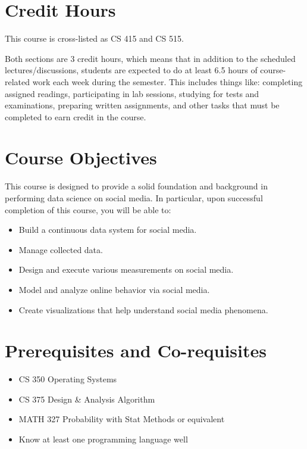 \documentclass[11pt,article,oneside]{memoir} %
\begin{document}
\section{Credit Hours}

This course is cross-listed as CS 415 and CS 515.

Both sections are 3 credit hours, which means that in addition to the scheduled lectures/discussions, students are expected to do at least 6.5 hours of course-related work each week during the semester.
This includes things like: completing assigned readings, participating in lab sessions, studying for tests and examinations, preparing written assignments, and other tasks that must be completed to earn credit in the course.

\section{Course Objectives}%

This course is designed to provide a solid foundation and background in performing data science on social media.
In particular, upon successful completion of this course, you will be able to:

\begin{itemize}
    \item Build a continuous data system for social media.
    \item Manage collected data.
    \item Design and execute various measurements on social media.
    \item Model and analyze online behavior via social media.
    \item Create visualizations that help understand social media phenomena.
\end{itemize}



\section{Prerequisites and Co-requisites}%
\label{sec:Prerequisites}

\begin{itemize}
    \item CS 350 Operating Systems
    \item CS 375 Design \& Analysis Algorithm
    \item MATH 327 Probability with Stat Methods or equivalent
    \item Know at least one programming language well
\end{itemize}
\end{document}
